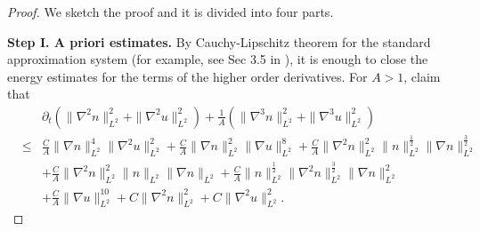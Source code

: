 \documentclass[12pt, reqno]{amsart}
\newcommand{\ben}{\begin{eqnarray}}
\newcommand{\een}{\end{eqnarray}}
\numberwithin{equation}{section}
\begin{document}
\begin{proof} 
We sketch the proof and it is divided into four parts.


{\bf Step I. A priori estimates.} By Cauchy-Lipschitz theorem for the standard approximation system (for example, see Sec 3.5 in \cite{Vicol2022}), it is enough to close the energy estimates for the terms of the higher order derivatives. For $A>1$, claim that
\ben\label{eq:higher order}
&&\partial_{t}\left(\|\nabla^{2}n\|_{L^{2}}^{2}+\|\nabla^{2}u\|_{L^{2}}^{2} \right)+\frac{1}{A}\left(\|\nabla^{3}n\|_{L^{2}}^{2}+\|\nabla^{3}u\|_{L^{2}}^{2} \right)\nonumber\\&\leq&\frac{C}{A}\|\nabla n\|_{L^{2}}^{4}\|\nabla^{2}u\|_{L^{2}}^{2}+\frac{C}{A}\|\nabla n\|_{L^{2}}^{2}\|\nabla u\|_{L^{2}}^{8}+\frac{C}{A}\|\nabla^{2}n\|_{L^{2}}^{2}\|n\|_{L^{2}}^{\frac12}\|\nabla n\|_{L^{2}}^{\frac32}\nonumber\\&&+\frac{C}{A}\|\nabla^{2}n\|_{L^{2}}^{2}\|n\|_{L^{2}}\|\nabla n\|_{L^{2}}+\frac{C}{A}\|n\|_{L^{2}}^{\frac12}\|\nabla^{2}n\|_{L^{2}}^{\frac32}\|\nabla n\|_{L^{2}}^{2}\nonumber\\&&+\frac{C}{A}\|\nabla u\|_{L^{2}}^{10}+C\|\nabla^{2}n\|_{L^{2}}^{2}+C\|\nabla^{2}u\|_{L^{2}}^{2}.
\een




\end{proof}
\end{document}

